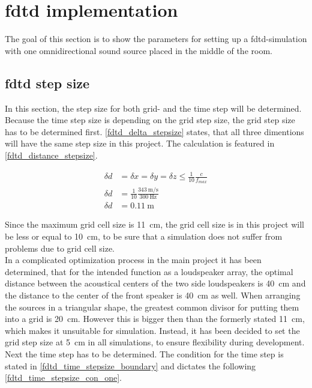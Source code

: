 \section{\gls{fdtd} implementation} \label{sec:fdtd_simulation}
The goal of this section is to show the parameters for setting up a \gls{fdtd}-simulation with one omnidirectional sound source placed in the middle of the room. 

\subsection{\gls{fdtd} step size}
In this section, the step size for both grid- and the time step will be determined. Because the time step size is depending on the grid step size, the grid step size has to be determined first. \autoref{fdtd_delta_stepsize} states, that all three dimentions will have the same step size in this project. The calculation is featured in \autoref{fdtd_distance_stepsize}.

\begin{subequations}\label{fdtd_distance_stepsize}
\begin{alignat}{2}
\delta d &= \delta x = \delta y = \delta z \leq \frac{1}{10} \frac{c}{f_{max}} \label{fdtd_distance_stepsize_1}\\
\delta d &= \frac{1}{10} \frac{\SI{343}{\meter\per\second}}{\SI{300}{\hertz}} \label{fdtd_distance_stepsize_2}\\
\delta d &= \SI{0.11}{\meter} \label{fdtd_distance_stepsize_3}
\end{alignat}
\end{subequations}

    \startexplain
    \stopexplain

Since the maximum grid cell size is \SI{11}{\centi\meter}, the grid cell size is in this project will be less or equal to \SI{10}{\centi\meter}, to be sure that a simulation does not suffer from problems due to grid cell size. \\

In a complicated optimization process in the main project it has been determined, that for the intended function as a loudspeaker array, the optimal distance between the acoustical centers of the two side loudspeakers is \SI{40}{\centi\meter} and the distance to the center of the front speaker is \SI{40}{\centi\meter} as well. When arranging the sources in a triangular shape, the greatest common divisor for putting them into a grid is \SI{20}{\centi\meter}. However this is bigger then than the formerly stated \SI{11}{\centi\meter}, which makes it unsuitable for simulation. Instead, it has been decided to set the grid step size at \SI{5}{\centi\meter} in all simulations, to ensure flexibility during development. Next the time step has to be determined. The condition for the time step is stated in \autoref{fdtd_time_stepsize_boundary} and dictates the following \autoref{fdtd_time_stepsize_con_one}.
    

